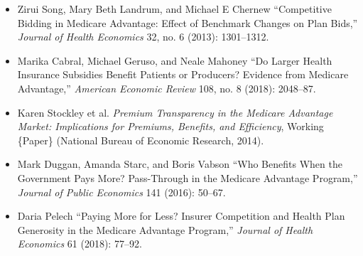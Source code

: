 \documentclass[11pt,]{article}
\providecommand{\tightlist}{%
  \setlength{\itemsep}{0pt}\setlength{\parskip}{0pt}}
\begin{document}
\begin{itemize}
\tightlist
\item
  Zirui Song, Mary Beth Landrum, and Michael E Chernew {``Competitive
  Bidding in {Medicare} {Advantage}: {Effect} of Benchmark Changes on
  Plan Bids,''} \emph{Journal of Health Economics} 32, no. 6 (2013):
  1301--1312.
\item
  Marika Cabral, Michael Geruso, and Neale Mahoney {``Do Larger Health
  Insurance Subsidies Benefit Patients or Producers? {Evidence} from
  {Medicare} {Advantage},''} \emph{American Economic Review} 108, no. 8
  (2018): 2048--87.
\item
  Karen Stockley et al. \emph{Premium {Transparency} in the {Medicare}
  {Advantage} {Market}: {Implications} for {Premiums}, {Benefits}, and
  {Efficiency}}, Working \{Paper\} (National Bureau of Economic
  Research, 2014).
\item
  Mark Duggan, Amanda Starc, and Boris Vabson {``Who Benefits When the
  Government Pays More? {Pass}-Through in the {Medicare} {Advantage}
  Program,''} \emph{Journal of Public Economics} 141 (2016): 50--67.
\item
  Daria Pelech {``Paying More for Less? {Insurer} Competition and Health
  Plan Generosity in the {Medicare} {Advantage} Program,''}
  \emph{Journal of Health Economics} 61 (2018): 77--92.
\end{itemize}
\end{document}
